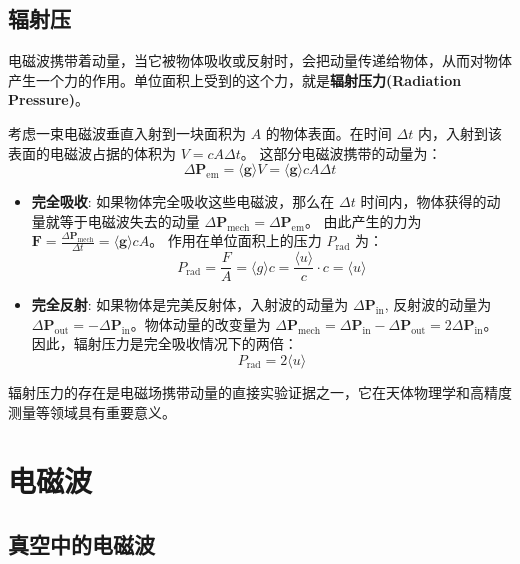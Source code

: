 \documentclass[fontset=none]{ctexart}
\begin{document}
\subsection{辐射压}
电磁波携带着动量，当它被物体吸收或反射时，会把动量传递给物体，从而对物体产生一个力的作用。单位面积上受到的这个力，就是\textbf{辐射压力(Radiation Pressure)}。

考虑一束电磁波垂直入射到一块面积为 $A$ 的物体表面。在时间 $\Delta t$ 内，入射到该表面的电磁波占据的体积为 $V = c A \Delta t$。
这部分电磁波携带的动量为：
\begin{equation}
    \Delta \bm{P}_{\text{em}} = \langle \bm{g} \rangle V = \langle \bm{g} \rangle c A \Delta t
\end{equation}
\begin{itemize}
    \item \textbf{完全吸收}: 如果物体完全吸收这些电磁波，那么在 $\Delta t$ 时间内，物体获得的动量就等于电磁波失去的动量 $\Delta \bm{P}_{\text{mech}} = \Delta \bm{P}_{\text{em}}$。
    由此产生的力为 $\bm{F} = \frac{\Delta \bm{P}_{\text{mech}}}{\Delta t} = \langle \bm{g} \rangle c A$。
    作用在单位面积上的压力 $P_{\text{rad}}$ 为：
    \begin{equation}
        P_{\text{rad}} = \frac{F}{A} = \langle g \rangle c = \frac{\langle u \rangle}{c} \cdot c = \langle u \rangle
    \end{equation}
    \item \textbf{完全反射}: 如果物体是完美反射体，入射波的动量为 $\Delta \bm{P}_{\text{in}}$, 反射波的动量为 $\Delta \bm{P}_{\text{out}} = -\Delta \bm{P}_{\text{in}}$。物体动量的改变量为 $\Delta \bm{P}_{\text{mech}} = \Delta \bm{P}_{\text{in}} - \Delta \bm{P}_{\text{out}} = 2 \Delta \bm{P}_{\text{in}}$。
    因此，辐射压力是完全吸收情况下的两倍：
    \begin{equation}
        P_{\text{rad}} = 2 \langle u \rangle
    \end{equation}
\end{itemize}
辐射压力的存在是电磁场携带动量的直接实验证据之一，它在天体物理学和高精度测量等领域具有重要意义。

\section{电磁波}

\subsection{真空中的电磁波}
\end{document}
